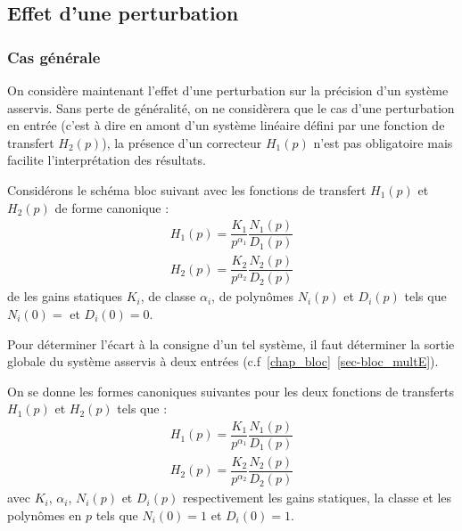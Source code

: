 \subsection{Effet d'une perturbation}
\subsubsection{Cas générale}
On considère maintenant l'effet d'une perturbation sur la précision d'un 
système asservis.
Sans perte de généralité, on ne considèrera que le cas d'une perturbation 
en entrée (c'est à dire en amont d'un système linéaire défini par une fonction 
de transfert $H_2(p)$), la présence d'un correcteur $H_1(p)$ n'est pas 
obligatoire mais facilite l'interprétation des résultats.

Considérons le schéma bloc suivant avec les fonctions de transfert $H_1(p)$ 
et $H_2(p)$ de forme canonique :
\begin{align*}
    H_1(p)=\dfrac{K_1}{p^{\alpha_1}}\dfrac{N_1(p)}{D_1(p)} \\
    H_2(p)=\dfrac{K_2}{p^{\alpha_2}}\dfrac{N_2(p)}{D_2(p)}
\end{align*}
de les gains statiques $K_i$, de classe $\alpha_i$, de polynômes $N_i(p)$
et $D_i(p)$ tels que $N_i(0)=$ et $D_i(0)=0$.
\begin{center}
    
\end{center}
Pour déterminer l'écart à la consigne d'un tel système, il faut déterminer
la sortie globale du système asservis à deux entrées 
(c.f~\cref{chap_bloc}~\cref{sec-bloc_multE}).

On se donne les formes canoniques suivantes pour les deux fonctions de 
transferts $H_1(p)$ et $H_2(p)$ tels que :
\begin{align*}
H_1(p)=\dfrac{K_1}{p^{\alpha_1}}\dfrac{N_1(p)}{D_1(p)}\\
H_2(p)=\dfrac{K_2}{p^{\alpha_2}}\dfrac{N_2(p)}{D_2(p)}
\end{align*}
avec $K_i$, $\alpha_i$, $N_i(p)$ et $D_i(p)$ respectivement les gains statiques,
la classe et les polynômes en $p$ tels que $N_i(0)=1$ et $D_i(0)=1$.

